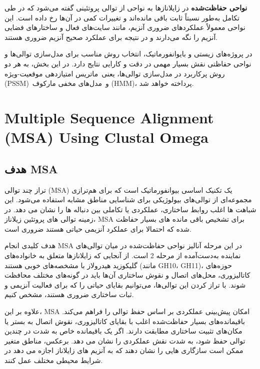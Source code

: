     \textbf{نواحی حفاظت‌شده} در زایلانازها به نواحی از توالی پروتئینی گفته می‌شود که در طی تکامل به‌طور نسبتاً ثابت باقی مانده‌اند و تغییرات کمی در آن‌ها رخ داده است. این نواحی معمولاً عملکردهای ضروری آنزیم، مانند سایت‌های فعال و ساختارهای فضایی آنزیم را نگه می‌دارند و در نتیجه برای عملکرد صحیح آنزیم ضروری هستند.

    در پروژه‌های زیستی و بایوانفورماتیک، انتخاب روش مناسب برای مدل‌سازی توالی‌ها و نواحی حفاظتی نقش بسیار مهمی در دقت و کارایی نتایج دارد. در این بخش، به هر دو روش پرکاربرد در مدل‌سازی توالی‌ها، یعنی ماتریس امتیازدهی موقعیت-ویژه (PSSM) و مدل‌های مخفی مارکوف (HMM)، پرداخته خواهد شد.


        \section{Multiple Sequence Alignment (MSA) Using Clustal Omega}
            \subsection{هدف MSA}
                تراز چند توالی 
                (MSA) 
                یک تکنیک اساسی بیوانفورماتیک است که برای هم‌ترازی مجموعه‌ای از توالی‌های بیولوژیکی برای شناسایی مناطق مشابه استفاده می‌شود. این شباهت ها اغلب روابط ساختاری، عملکردی یا تکاملی بین دنباله ها را نشان می دهد. در زمینه توالی های پروتئین زیلاناز، 
                MSA 
                برای تشخیص باقی مانده های بسیار حفاظت شده که احتمالا برای عملکرد آنزیمی حیاتی هستند ضروری است.

                هدف کلیدی انجام 
                MSA 
                در این مرحله آنالیز نواحی حفاظت‌شده در میان توالی‌های نماینده به‌دست‌آمده از مرحله 2 است. از آنجایی که زایلانازها متعلق به خانواده‌های گلیکوزید هیدرولاز با مشخصه‌های خوبی هستند 
                (مانند GH10، GH11)، 
                حوزه‌های کاتالیزوری، محل‌های اتصال و نقوش ساختاری آن‌ها باید در گونه‌های مختلف محافظت شوند. با تراز کردن این توالی‌ها، می‌توانیم بقایای حیاتی را که برای فعالیت آنزیمی و ثبات ساختاری ضروری هستند، مشخص کنیم.
                
                علاوه بر این، MSA امکان پیش‌بینی عملکردی بر اساس حفظ توالی را فراهم می‌کند. باقیمانده‌های بسیار حفاظت‌شده اغلب با بقایای کاتالیزوری، نقوش اتصال به بستر یا مکان‌های تثبیت ساختاری مطابقت دارند. اگر یک باقیمانده خاص به شدت در چندین توالی حفظ شود، به شدت نقش عملکردی را نشان می دهد. برعکس، مناطق متغیر ممکن است سازگاری هایی را نشان دهند که به آنزیم های زایلاناز اجازه می دهد در شرایط محیطی مختلف عمل کنند.
                
